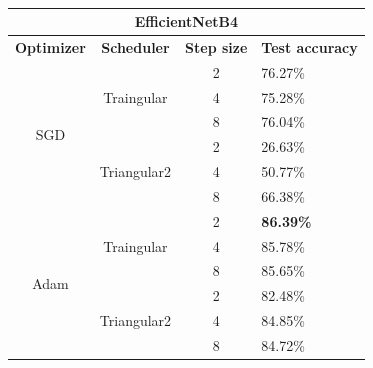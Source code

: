 \begin{table}[ht!]
\centering
\caption{}
\label{tab:my-table}
\begin{tabular}{|ccll|}
\hline
\multicolumn{4}{|c|}{\textbf{EfficientNetB4}}                                          \\ \hline
\multicolumn{1}{|c|}{\textbf{Optimizer}}    & \multicolumn{1}{c|}{\textbf{Scheduler}}           & \multicolumn{1}{c|}{\textbf{Step size}} & \textbf{Test accuracy} \\ \hline
\multicolumn{1}{|c|}{\multirow{6}{*}{SGD}}  & \multicolumn{1}{c|}{\multirow{3}{*}{Traingular}}  & \multicolumn{1}{c|}{2}                  &  76.27\%                \\ \cline{3-4} 
\multicolumn{1}{|c|}{} & \multicolumn{1}{c|}{} & \multicolumn{1}{c|}{4} & 75.28\% \\ \cline{3-4} 
\multicolumn{1}{|c|}{} & \multicolumn{1}{c|}{} & \multicolumn{1}{c|}{8} & 76.04\% \\ \cline{2-4} 
\multicolumn{1}{|c|}{}                      & \multicolumn{1}{c|}{\multirow{3}{*}{Triangular2}} & \multicolumn{1}{c|}{2}                  &  26.63\%               \\ \cline{3-4} 
\multicolumn{1}{|c|}{} & \multicolumn{1}{c|}{} & \multicolumn{1}{c|}{4} & 50.77\% \\ \cline{3-4} 
\multicolumn{1}{|c|}{} & \multicolumn{1}{c|}{} & \multicolumn{1}{c|}{8} & 66.38\% \\ \hline
\multicolumn{1}{|c|}{\multirow{6}{*}{Adam}} & \multicolumn{1}{c|}{\multirow{3}{*}{Traingular}}  & \multicolumn{1}{c|}{2}                  & \textbf{86.39\%}       \\ \cline{3-4} 
\multicolumn{1}{|c|}{} & \multicolumn{1}{c|}{} & \multicolumn{1}{c|}{4} & 85.78\% \\ \cline{3-4} 
\multicolumn{1}{|c|}{} & \multicolumn{1}{c|}{} & \multicolumn{1}{c|}{8} & 85.65\% \\ \cline{2-4} 
\multicolumn{1}{|c|}{}                      & \multicolumn{1}{c|}{\multirow{3}{*}{Triangular2}} & \multicolumn{1}{c|}{2}                  & 82.48\%                \\ \cline{3-4} 
\multicolumn{1}{|c|}{} & \multicolumn{1}{c|}{} & \multicolumn{1}{c|}{4} & 84.85\% \\ \cline{3-4} 
\multicolumn{1}{|c|}{} & \multicolumn{1}{c|}{} & \multicolumn{1}{c|}{8} & 84.72\% \\ \hline
\end{tabular}
\end{table}


